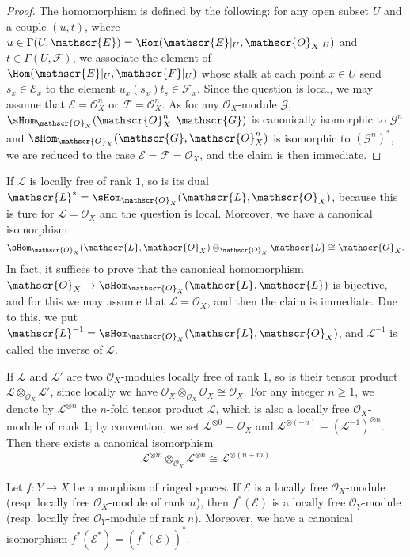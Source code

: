 \begin{proof}
The homomorphism is defined by the following: for any open subset $U$ and a couple $(u,t)$, where $u\in\Gamma(U,\mathscr{E})=\Hom(\mathscr{E}|_U,\mathscr{O}_X|_U)$ and $t\in\Gamma(U,\mathscr{F})$, we associate the element of $\Hom(\mathscr{E}|_U,\mathscr{F}|_U)$ whose stalk at each point $x\in U$ send $s_x\in\mathscr{E}_x$ to the element $u_x(s_x)t_s\in\mathscr{F}_x$. Since the question is local, we may assume that $\mathscr{E}=\mathscr{O}_X^n$ or $\mathscr{F}=\mathscr{O}_X^n$. As for any $\mathscr{O}_X$-module $\mathscr{G}$, $\sHom_{\mathscr{O}_X}(\mathscr{O}_X^n,\mathscr{G})$ is canonically isomorphic to $\mathscr{G}^n$ and $\sHom_{\mathscr{O}_X}(\mathscr{G},\mathscr{O}_X^n)$ is isomorphic to $(\mathscr{G}^n)^*$, we are reduced to the case $\mathscr{E}=\mathscr{F}=\mathscr{O}_X$, and the claim is then immediate.
\end{proof}
If $\mathscr{L}$ is locally free of rank $1$, so is its dual $\mathscr{L}^*=\sHom_{\mathscr{O}_X}(\mathscr{L},\mathscr{O}_X)$, because this is ture for $\mathscr{L}=\mathscr{O}_X$ and the question is local. Moreover, we have a canonical isomorphism
\[\sHom_{\mathscr{O}_X}(\mathscr{L},\mathscr{O}_X)\otimes_{\mathscr{O}_X}\mathscr{L}\cong\mathscr{O}_{X}.\]
In fact, it suffices to prove that the canonical homomorphism $\mathscr{O}_X\to\sHom_{\mathscr{O}_X}(\mathscr{L},\mathscr{L})$ is bijective, and for this we may assume that $\mathscr{L}=\mathscr{O}_X$, and then the claim is immediate. Due to this, we put $\mathscr{L}^{-1}=\sHom_{\mathscr{O}_X}(\mathscr{L},\mathscr{O}_X)$, and $\mathscr{L}^{-1}$ is called the inverse of $\mathscr{L}$.\par
If $\mathscr{L}$ and $\mathscr{L}'$ are two $\mathscr{O}_X$-modules locally free of rank $1$, so is their tensor product $\mathscr{L}\otimes_{\mathscr{O}_X}\mathscr{L}'$, since locally we have $\mathscr{O}_X\otimes_{\mathscr{O}_X}\mathscr{O}_X\cong\mathscr{O}_X$. For any integer $n\geq 1$, we denote by $\mathscr{L}^{\otimes n}$ the $n$-fold tensor product $\mathscr{L}$, which is also a locally free $\mathscr{O}_X$-module of rank $1$; by convention, we set $\mathscr{L}^{\otimes 0}=\mathscr{O}_X$ and $\mathscr{L}^{\otimes(-n)}=(\mathscr{L}^{-1})^{\otimes n}$. Then there exists a canonical isomorphism
\[\mathscr{L}^{\otimes m}\otimes_{\mathscr{O}_X}\mathscr{L}^{\otimes n}\cong\mathscr{L}^{\otimes(n+m)}\]
\begin{proposition}\label{sheaf of module local free inverse image}
Let $f:Y\to X$ be a morphism of ringed spaces. If $\mathscr{E}$ is a locally free $\mathscr{O}_X$-module (resp. locally free $\mathscr{O}_X$-module of rank $n$), then $f^*(\mathscr{E})$ is a locally free $\mathscr{O}_Y$-module (resp. locally free $\mathscr{O}_Y$-module of rank $n$). Moreover, we have a canonical isomorphism $f^*(\mathscr{E}^*)=(f^*(\mathscr{E}))^*$.
\end{proposition}

